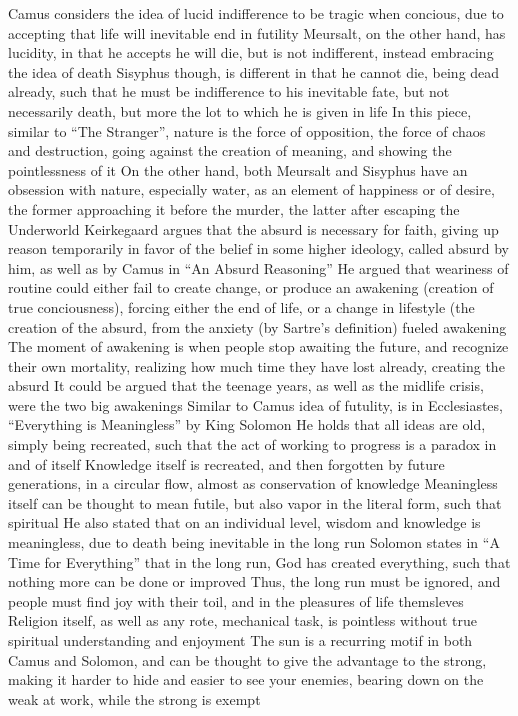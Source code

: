\documentclass[11 pt, twoside]{article}
\newenvironment{outline*}
{
	\begin{outline}[enumerate]
	}
	{\end{outline}
}
\begin{document}
\begin{outline*}
\3 Camus considers the idea of lucid indifference to be tragic when concious, due to accepting that life will inevitable end in futility
\3 Meursalt, on the other hand, has lucidity, in that he accepts he will die, but is not indifferent, instead embracing the idea of death
\3 Sisyphus though, is different in that he cannot die, being dead already, such that he must be indifference to his inevitable fate, but not necessarily death, but more the lot to which he is given in life
\2 In this piece, similar to ``The Stranger'', nature is the force of opposition, the force of chaos and destruction, going against the creation of meaning, and showing the pointlessness of it
\3 On the other hand, both Meursalt and Sisyphus have an obsession with nature, especially water, as an element of happiness or of desire, the former approaching it before the murder, the latter after escaping the Underworld
\1 Keirkegaard argues that the absurd is necessary for faith, giving up reason temporarily in favor of the belief in some higher ideology, called absurd by him, as well as by Camus in ``An Absurd Reasoning''
\2 He argued that weariness of routine could either fail to create change, or produce an awakening (creation of true conciousness), forcing either the end of life, or a change in lifestyle (the creation of the absurd, from the anxiety (by Sartre's definition) fueled awakening
\3 The moment of awakening is when people stop awaiting the future, and recognize their own mortality, realizing how much time they have lost already, creating the absurd
\3 It could be argued that the teenage years, as well as the midlife crisis, were the two big awakenings
\1 Similar to Camus idea of futulity, is in Ecclesiastes, ``Everything is Meaningless'' by King Solomon
\2 He holds that all ideas are old, simply being recreated, such that the act of working to progress is a paradox in and of itself
\3 Knowledge itself is recreated, and then forgotten by future generations, in a circular flow, almost as conservation of knowledge
\2 Meaningless itself can be thought to mean futile, but also vapor in the literal form, such that spiritual 
\2 He also stated that on an individual level, wisdom and knowledge is meaningless, due to death being inevitable in the long run
\1 Solomon states in ``A Time for Everything'' that in the long run, God has created everything, such that nothing more can be done or improved
\2 Thus, the long run must be ignored, and people must find joy with their toil, and in the pleasures of life themsleves
\2 Religion itself, as well as any rote, mechanical task, is pointless without true spiritual understanding and enjoyment
\1 The sun is a recurring motif in both Camus and Solomon, and can be thought to give the advantage to the strong, making it harder to hide and easier to see your enemies, bearing down on the weak at work, while the strong is exempt
\end{outline*}
\end{document}
